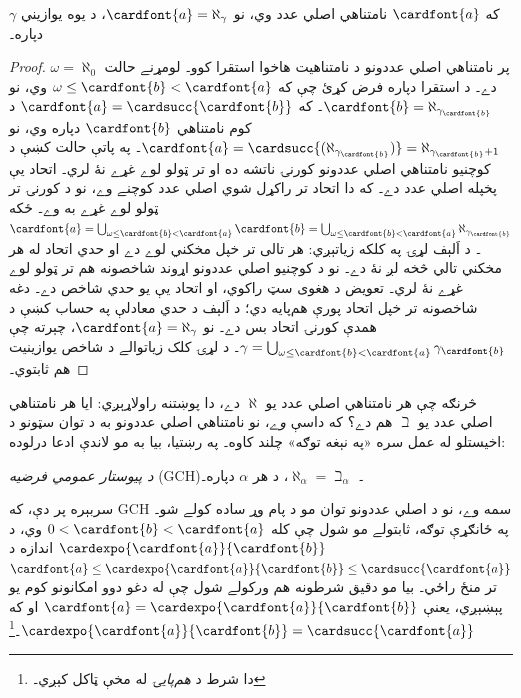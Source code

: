 \documentclass[../../../include/open-logic-section]{subfiles}
\begin{document}
\begin{prop}
که $\cardfont{a}$ نامتناهي اصلي عدد وي، نو
$\cardfont{a} = \aleph_\gamma$، د يوه يوازيني $\gamma$ دپاره۔
\end{prop}

\begin{proof}
پر نامتناهي اصلي عددونو د نامتناهيت هاخوا استقرا کوو۔
لومړنے حالت $\omega=\aleph_0$ دے۔ د استقرا دپاره فرض
کړئ چې که $\omega\leq\cardfont{b} < \cardfont{a}$ وي، نو
$\cardfont{b} = \aleph_{\gamma_\cardfont{b}}$۔ که
$\cardfont{a} = \cardsucc{\cardfont{b}}$ د کوم نامتناهي
$\cardfont{b}$ دپاره وي، نو $\cardfont{a} =
\cardsucc{(\aleph_{\gamma_\cardfont{b}})}=
\aleph_{\gamma_\cardfont{b}+1}$۔ په پاتې حالت کښې د کوچنيو
نامتناهي اصلي عددونو کورنۍ ناتشه ده او تر ټولو لوے غړے نۀ لري۔
اتحاد يې پخپله اصلي عدد دے۔ که دا اتحاد تر راکړل شوي اصلي عدد
کوچنے وے، نو د کورنۍ تر ټولو لوے غړے به وے۔ ځکه
$\cardfont{a} = \bigcup_{\omega\leq\cardfont{b}<\cardfont{a}} \cardfont{b} =
\bigcup_{\omega\leq\cardfont{b}<\cardfont{a}}{\aleph_{\gamma_\cardfont{b}}}$۔
د اَلېف لړۍ په کلکه زياتېږي: هر تالی تر خپل مخکني لوے دے
او حدي اتحاد له هر مخکني تالي څخه لږ نۀ دے۔ نو د کوچنيو
اصلي عددونو اړوند شاخصونه هم تر ټولو لوے غړے نۀ لري۔ تعويض
د هغوی سټ راکوي، او اتحاد يې يو حدي شاخص دے۔ دغه شاخصونه
تر خپل اتحاد پورې هم‌پايه دي؛ د اَلېف د حدي معادلې په حساب
کښې د همدې کورنۍ اتحاد بس دے۔ نو
$\cardfont{a} = \aleph_\gamma$، چېرته چې $\gamma =
\bigcup_{\omega\leq\cardfont{b}<\cardfont{a}}\gamma_\cardfont{b}$۔
د لړۍ کلک زياتوالے د شاخص يوازينيت هم ثابتوي۔
\end{proof}

څرنګه چې هر نامتناهي اصلي عدد يو $\aleph$ دے، دا پوښتنه راولاړېږي:
ايا هر نامتناهي اصلي عدد يو $\beth$ هم دے؟ که داسې \emph{وے}،
نو نامتناهي اصلي عددونو به د توان سټونو د اخيستلو له عمل سره
«په نېغه توګه» چلند کاوه۔ په رښتيا، بيا به مو لاندې ادعا درلوده:

\begin{defish}
\emph{د پيوستار عمومي فرضيه} (GCH)۔
$\aleph_\alpha  = \beth_\alpha$، د هر $\alpha$ دپاره۔
\end{defish}

سربېره پر دې، که GCH سمه وے، نو د اصلي عددونو توان مو د پام وړ
ساده کولے شو۔ په ځانګړې توګه، ثابتولے مو شول چې کله
$0<\cardfont{b} < \cardfont{a}$ وي، د
$\cardexpo{\cardfont{a}}{\cardfont{b}}$ اندازه د
$\cardfont{a}\leq \cardexpo{\cardfont{a}}{\cardfont{b}} \leq
\cardsucc{\cardfont{a}}$ تر منځ راځي۔ بيا مو دقيق شرطونه هم
ورکولے شول چې له دغو دوو امکانونو کوم يو پېښېږي، يعنې
$\cardfont{a} = \cardexpo{\cardfont{a}}{\cardfont{b}}$
او که $\cardexpo{\cardfont{a}}{\cardfont{b}} =
\cardsucc{\cardfont{a}}$۔\footnote{دا شرط د
\emph{هم‌پايۍ} له مخې ټاکل کېږي۔}
\end{document}
